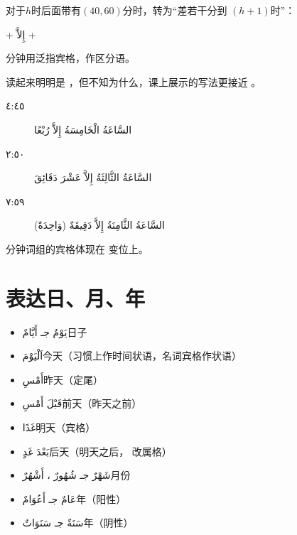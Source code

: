 对于$h$时后面带有$\left( 40, 60 \right)$分时，转为``差若干分到 $\left( h+1\right)$时''：

\begin{Arabic}
    \begin{center}
        \tto {} + إِلاَّ +  \tto
    \end{center}
\end{Arabic}

\begin{attention}
    分钟用泛指宾格，作区分语。
\end{attention}

\begin{note}
    读起来明明是 ，但不知为什么，课上展示的写法更接近 。
\end{note}

\begin{Arabic}
    \begin{description}
        \item[٤:٤٥] السَّاعَةُ الْخَامِسَةُ إِلاَّ رُبْعًا 
        \item[٢:٥٠] السَّاعَةُ الثَّالِثَةُ إِلاَّ عَشْرَ\red{$^*$} دَقَائِقَ
        \item[٧:٥٩] السَّاعَةُ الثَّامِنَةُ إِلاَّ دَقِيقَةً (وَاحِدَةً)
    \end{description}
\end{Arabic}

\begin{attention}
    \red{$^*$} 分钟词组的宾格体现在  变位上。
\end{attention}

\section{ 表达日、月、年}

\begin{itemize}
    \item \ac{يَوْمٌ جـ أَيَّامٌ}{日子}
    \item \ac{اَلْيَوْمَ}{今天（习惯上作时间状语，名词宾格作状语）} 
    \item \ac{أَمْسِ}{昨天（定尾）}
    \item \ac{قَبْلَ أَمْسِ}{前天（昨天之前）}
    \item \ac{غَدًا}{明天（宾格）}
    \item \ac{بَعْدَ غَدٍ}{后天（明天之后， 改属格）}
    \item \ac{شَهْرٌ جـ شُهُورٌ ، أَشْهُرٌ}{月份}
    \item \ac{عَامٌ جـ أَعُوَامٌ}{年（阳性）}
    \item \ac{سَنَةٌ جـ سَنَوَاتٌ}{年（阴性）}
\end{itemize}

